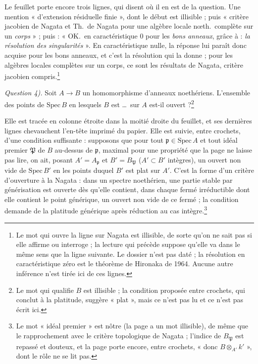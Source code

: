 \documentclass[11pt,a4paper]{article}
\begin{document}
Le feuillet porte encore trois lignes, qui disent où il en est de la question.
Une mention « d'extension résiduelle finie », dont le début est illisible ; puis
« critère jacobien de Nagata et Th.\ de Nagata pour une algèbre locale nœth.\
complète sur un \emph{corps} » ; puis : « OK.\ en caractéristique $0$ pour les
\emph{bons anneaux}, grâce à : \emph{la résolution des singularités} ». En
caractéristique nulle, la réponse lui paraît donc acquise pour les bons
anneaux, et c'est la résolution qui la donne ; pour les algèbres locales
complètes sur un corps, ce sont les résultats de Nagata, critère jacobien
compris.\footnote{Le mot qui ouvre la ligne sur Nagata est illisible, de sorte
qu'on ne sait pas si elle affirme ou interroge ; la lecture qui précède suppose
qu'elle va dans le même sens que la ligne suivante. Le dossier n'est pas daté ;
la résolution en caractéristique zéro est le théorème de Hironaka de 1964.
Aucune autre inférence n'est tirée ici de ces lignes.}

\emph{Question 4).} Soit $A \to B$ un homomorphisme d'anneaux noethériens.
L'ensemble des points de $\mathrm{Spec}\,B$ en lesquels $B$ est \ldots\ sur $A$
est-il ouvert ?\footnote{Le mot qui qualifie $B$ est illisible ; la condition
proposée entre crochets, qui conclut à la platitude, suggère « plat », mais ce
n'est pas lu et ce n'est pas écrit ici.}

Elle est tracée en colonne étroite dans la moitié droite du feuillet, et ses
dernières lignes chevauchent l'en-tête imprimé du papier. Elle est suivie,
entre crochets, d'une condition suffisante : supposons que pour tout
$\mathfrak{p} \in \mathrm{Spec}\,A$ et tout idéal premier $\mathfrak{P}$ de $B$
au-dessus de $\mathfrak{p}$, maximal pour une propriété que la page ne laisse
pas lire, on ait, posant $A' = A_{\mathfrak{p}}$ et $B' = B_{\mathfrak{P}}$
($A' \subset B'$ intègres), un ouvert non vide de $\mathrm{Spec}\,B'$ en les
points duquel $B'$ est plat sur $A'$. C'est la forme d'un critère d'ouverture à
la Nagata : dans un spectre noethérien, une partie stable par générisation est
ouverte dès qu'elle contient, dans chaque fermé irréductible dont elle contient
le point générique, un ouvert non vide de ce fermé ; la
condition demande de la platitude générique après réduction au cas
intègre.\footnote{Le mot « idéal premier » est nôtre (la page a un mot
illisible), de même que le rapprochement avec le critère topologique de Nagata ;
l'indice de $B_{\mathfrak{P}}$ est repassé et douteux, et la page porte encore,
entre crochets, « donc $B \otimes_{A'} k'$ », dont le rôle ne se lit pas.}
\end{document}
